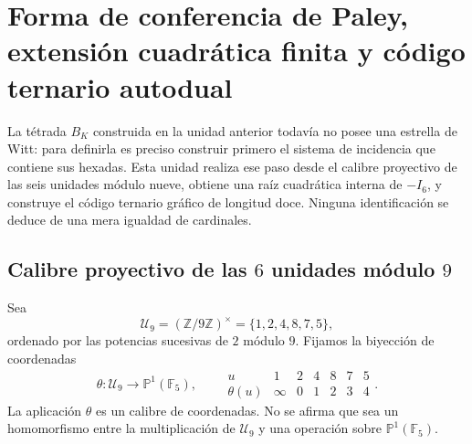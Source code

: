 \label{chap:83-20}




\section{Forma de conferencia de Paley, extensión cuadrática finita y código ternario autodual}
\label{p12-83-c20-s1:chap:paley-extension-cuadratica-codigo-ternario}

La tétrada \(B_K\) construida en la unidad anterior todavía no posee una
estrella de Witt: para definirla es preciso construir primero el sistema de
incidencia que contiene sus hexadas. Esta unidad realiza ese paso desde el
calibre proyectivo de las seis unidades módulo nueve, obtiene una raíz
cuadrática interna de \(-I_6\), y construye el código ternario gráfico de
longitud doce. Ninguna identificación se deduce de una mera igualdad de
cardinales.

\subsection{Calibre proyectivo de las \(6\) unidades módulo \(9\)}

Sea
\[
 \mathcal U_9=(\mathbb Z/9\mathbb Z)^\times
 =\{1,2,4,8,7,5\},
\]
ordenado por las potencias sucesivas de \(2\) módulo \(9\). Fijamos la
biyección de coordenadas
\begin{equation}
 \theta:\mathcal U_9\longrightarrow\mathbb P^1(\mathbb F_5),
 \qquad
 \begin{array}{c|cccccc}
 u&1&2&4&8&7&5\\ \hline
 \theta(u)&\infty&0&1&2&3&4
 \end{array}.
 \label{p12-83-c20-s1:eq:calibre-unidades-paley}
\end{equation}
La aplicación \(\theta\) es un calibre de coordenadas. No se afirma que
sea un homomorfismo entre la multiplicación de \(\mathcal U_9\) y una
operación sobre \(\mathbb P^1(\mathbb F_5)\).

